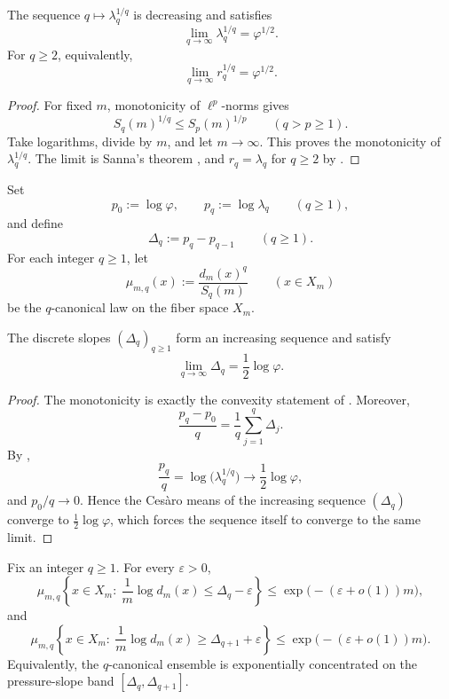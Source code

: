\begin{corollary}
\label{cor:renyi-endpoint}
The sequence \(q\mapsto \lambda_q^{1/q}\) is decreasing and satisfies
\[
  \lim_{q\to\infty}\lambda_q^{1/q}=\varphi^{1/2}.
\]
For \(q\ge 2\), equivalently,
\[
  \lim_{q\to\infty}r_q^{1/q}=\varphi^{1/2}.
\]
\end{corollary}

\begin{proof}
For fixed \(m\), monotonicity of \(\ell^p\)-norms gives
\[
  S_q(m)^{1/q}\le S_p(m)^{1/p}
  \qquad (q>p\ge 1).
\]
Take logarithms, divide by \(m\), and let \(m\to\infty\).  This proves the
monotonicity of \(\lambda_q^{1/q}\).  The limit is Sanna's theorem
\cite{Sanna2025}, and \(r_q=\lambda_q\) for \(q\ge 2\) by
.
\end{proof}

\begin{definition}
\label{def:pressure-slopes}
Set
\[
  p_0:=\log\varphi,
  \qquad
  p_q:=\log\lambda_q
  \qquad (q\ge 1),
\]
and define
\[
  \Delta_q:=p_q-p_{q-1}
  \qquad (q\ge 1).
\]
For each integer \(q\ge 1\), let
\[
  \mu_{m,q}(x):=\frac{d_m(x)^q}{S_q(m)}
  \qquad (x\in X_m)
\]
be the \(q\)-canonical law on the fiber space \(X_m\).
\end{definition}

\begin{corollary}
\label{cor:pressure-slopes}
The discrete slopes \((\Delta_q)_{q\ge 1}\) form an increasing sequence and
satisfy
\[
  \lim_{q\to\infty}\Delta_q=\frac12\log\varphi.
\]
\end{corollary}

\begin{proof}
The monotonicity is exactly the convexity statement of
.  Moreover,
\[
  \frac{p_q-p_0}{q}
  =
  \frac1q\sum_{j=1}^q \Delta_j.
\]
By ,
\[
  \frac{p_q}{q}
  =
  \log\bigl(\lambda_q^{1/q}\bigr)
  \to
  \frac12\log\varphi,
\]
and \(p_0/q\to 0\).  Hence the Ces\`aro means of the increasing sequence
\((\Delta_q)\) converge to \(\frac12\log\varphi\), which forces the sequence
itself to converge to the same limit.
\end{proof}

\begin{theorem}
\label{thm:gibbs-selection}
Fix an integer \(q\ge 1\).  For every \(\varepsilon>0\),
\[
  \mu_{m,q}\!\left\{
    x\in X_m:\ \frac1m\log d_m(x)\le \Delta_q-\varepsilon
  \right\}
  \le
  \exp\bigl(-(\varepsilon+o(1))m\bigr),
\]
and
\[
  \mu_{m,q}\!\left\{
    x\in X_m:\ \frac1m\log d_m(x)\ge \Delta_{q+1}+\varepsilon
  \right\}
  \le
  \exp\bigl(-(\varepsilon+o(1))m\bigr).
\]
Equivalently, the \(q\)-canonical ensemble is exponentially concentrated on the
pressure-slope band \([\Delta_q,\Delta_{q+1}]\).
\end{theorem}

